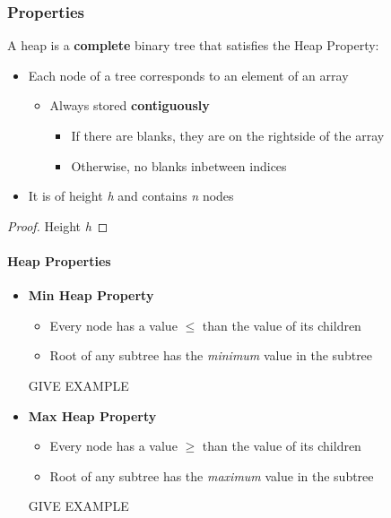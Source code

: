 \documentclass[10pt, 
a4paper, 
oneside, 
headinclude, footinclude, 
BCOR5mm]
{scrartcl}
\begin{document}
\subsubsection{Properties}
A heap is a \textbf{complete} binary tree that satisfies the Heap Property:
\begin{itemize}
    \item Each node of a tree corresponds to an element of an array
    \begin{itemize}
        \item Always stored \textbf{contiguously}
        \begin{itemize}
            \item  If there are blanks, they are on the rightside of the array
            \item  Otherwise, no blanks inbetween indices
        \end{itemize}
    \end{itemize}
    \item It is of height \textit{h} and contains \textit{n} nodes
\end{itemize}

\begin{proof}
    Height \textit{h}
\end{proof}
\BlankLine

\paragraph{\textbf{Heap Properties}}
\begin{itemize}
    \item \textbf{Min Heap Property}
    \begin{itemize}
        \item Every node has a value $\leq$ than the value of its children
        \item Root of any subtree has the \textit{minimum} value in the subtree    
    \end{itemize}
    GIVE EXAMPLE
    \item \textbf{Max Heap Property}
    \begin{itemize}
        \item Every node has a value $\geq$ than the value of its children
        \item Root of any subtree has the \textit{maximum} value in the subtree
    \end{itemize}
    GIVE EXAMPLE
\end{itemize}
\end{document}
